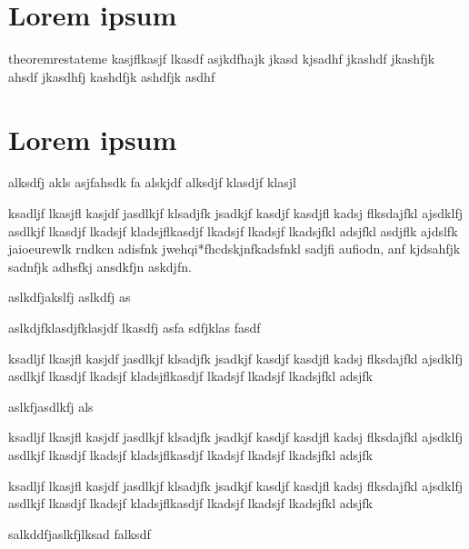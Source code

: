 \documentclass[tikz]{nmd/article}
\begin{document}
\section{Lorem ipsum}

\lipsum[1-5]

\begin{restatable}{theorem}{restateme}
  kasjflkasjf lkasdf asjkdfhajk jkasd kjsadhf jkashdf jkashfjk ahsdf
  jkasdhfj kashdfjk ashdfjk asdhf 
\end{restatable}

\lipsum[6]

\section{Lorem ipsum}

alksdfj akls asjfahsdk fa alskjdf alksdjf klasdjf klasjl

\begin{theorem}
  ksadljf lkasjfl kasjdf jasdlkjf klsadjfk jsadkjf kasdjf kasdjfl
  kadsj flksdajfkl ajsdklfj asdlkjf lkasdjf lkadsjf kladsjflkasdjf
  lkadsjf lkadsjf lkadsjfkl adsjfkl asdjflk ajdslfk jaioeurewlk rndkcn
  adisfnk jwehqi*fhcdskjnfkadsfnkl sadjfi aufiodn, anf kjdsahfjk
  sadnfjk adhsfkj ansdkfjn askdjfn.
\end{theorem}

\restateme

aslkdfjakslfj aslkdfj as 

\restateme

aslkdjfklasdjfklasjdf lkasdfj
asfa sdfjklas fasdf
 

\restateme


\begin{theorem}
  ksadljf lkasjfl kasjdf jasdlkjf klsadjfk jsadkjf kasdjf kasdjfl
  kadsj flksdajfkl ajsdklfj asdlkjf lkasdjf lkadsjf kladsjflkasdjf
  lkadsjf lkadsjf lkadsjfkl adsjfk
\end{theorem}

aslkfjasdlkfj als

\begin{theorem}
  ksadljf lkasjfl kasjdf jasdlkjf klsadjfk jsadkjf kasdjf kasdjfl
  kadsj flksdajfkl ajsdklfj asdlkjf lkasdjf lkadsjf kladsjflkasdjf
  lkadsjf lkadsjf lkadsjfkl adsjfk
\end{theorem}

\begin{theorem}
  ksadljf lkasjfl kasjdf jasdlkjf klsadjfk jsadkjf kasdjf kasdjfl
  kadsj flksdajfkl ajsdklfj asdlkjf lkasdjf lkadsjf kladsjflkasdjf
  lkadsjf lkadsjf lkadsjfkl adsjfk
\end{theorem}

salkddfjaslkfjlksad falksdf 

\restateme

\lipsum[6-15]
\end{document}
